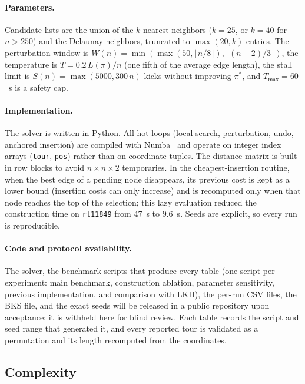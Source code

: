 \documentclass[runningheads]{llncs}
\begin{document}
\paragraph{Parameters.}
Candidate lists are the union of the $k$ nearest neighbors ($k=25$, or
$k=40$ for $n>250$) and the Delaunay neighbors, truncated to
$\max(20,k)$ entries. The perturbation window is
$W(n)=\min(\max(50,\lfloor n/8\rfloor),\lfloor(n-2)/3\rfloor)$, the
temperature is $T=0.2\,L(\pi)/n$ (one fifth of the average edge
length), the stall limit is $S(n)=\max(5000,300\,n)$ kicks without
improving $\pi^*$, and $T_{\max}=60$~s is a safety cap.

\paragraph{Implementation.}
The solver is written in Python. All hot loops (local search,
perturbation, undo, anchored insertion) are compiled with
Numba~\cite{lam2015numba} and operate on integer index arrays
(\texttt{tour}, \texttt{pos}) rather than on coordinate tuples. The
distance matrix is built in row blocks to avoid $n\times n\times 2$
temporaries. In the cheapest-insertion routine, when the best edge of a
pending node disappears, its previous cost is kept as a lower bound
(insertion costs can only increase) and is recomputed only when that
node reaches the top of the selection; this lazy evaluation reduced the
construction time on \texttt{rl11849} from 47~s to 9.6~s. Seeds are
explicit, so every run is reproducible.

\paragraph{Code and protocol availability.} The solver, the benchmark
scripts that produce every table (one script per experiment: main
benchmark, construction ablation, parameter sensitivity, previous
implementation, and comparison with LKH), the per-run CSV files, the
BKS file, and the exact seeds will be released in a public repository
upon acceptance; it is withheld here for blind review. Each table
records the script and seed range that generated it, and every reported
tour is validated as a permutation and its length recomputed from the
coordinates.

\subsection{Complexity}
\label{sec:complexity}
\end{document}
